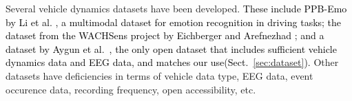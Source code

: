 \documentclass[letterpaper, 10 pt, conference]{ieeeconf}  %
\newcommand{\Review}[1]{\textcolor{black}{#1}}
\begin{document}

Several vehicle dynamics datasets have been developed.
\Review{These include PPB-Emo by Li et al. \cite{Li2022}, a multimodal dataset for emotion recognition in driving tasks; 
the dataset from the WACHSens project by Eichberger and Arefnezhad \cite{Eichberger2022}; 
and a dataset by Aygun et al.~\cite{Aygun2024}, 
the only open dataset that includes sufficient vehicle dynamics data and EEG data, and matches our use(Sect.~\ref{sec:dataset}).}
Other datasets have deficiencies in terms of vehicle data type, EEG data, event occurence data, recording frequency, open accessibility, etc.
%

\end{document}
